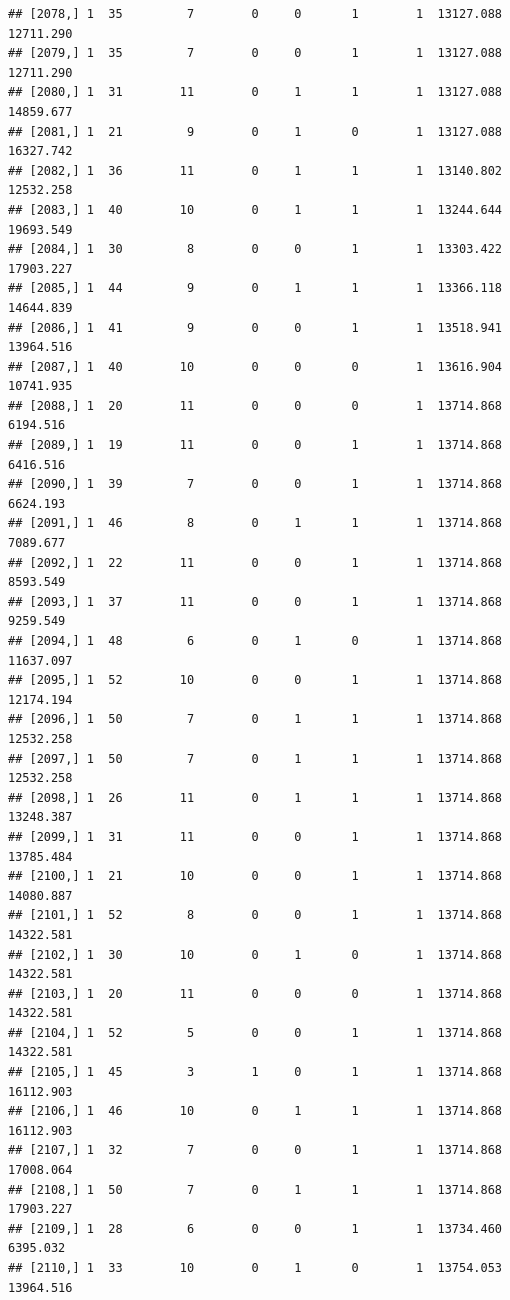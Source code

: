 \documentclass[
]{article}
\begin{document}
\begin{verbatim}
## [2078,] 1  35         7        0     0       1        1  13127.088  12711.290
## [2079,] 1  35         7        0     0       1        1  13127.088  12711.290
## [2080,] 1  31        11        0     1       1        1  13127.088  14859.677
## [2081,] 1  21         9        0     1       0        1  13127.088  16327.742
## [2082,] 1  36        11        0     1       1        1  13140.802  12532.258
## [2083,] 1  40        10        0     1       1        1  13244.644  19693.549
## [2084,] 1  30         8        0     0       1        1  13303.422  17903.227
## [2085,] 1  44         9        0     1       1        1  13366.118  14644.839
## [2086,] 1  41         9        0     0       1        1  13518.941  13964.516
## [2087,] 1  40        10        0     0       0        1  13616.904  10741.935
## [2088,] 1  20        11        0     0       0        1  13714.868   6194.516
## [2089,] 1  19        11        0     0       1        1  13714.868   6416.516
## [2090,] 1  39         7        0     0       1        1  13714.868   6624.193
## [2091,] 1  46         8        0     1       1        1  13714.868   7089.677
## [2092,] 1  22        11        0     0       1        1  13714.868   8593.549
## [2093,] 1  37        11        0     0       1        1  13714.868   9259.549
## [2094,] 1  48         6        0     1       0        1  13714.868  11637.097
## [2095,] 1  52        10        0     0       1        1  13714.868  12174.194
## [2096,] 1  50         7        0     1       1        1  13714.868  12532.258
## [2097,] 1  50         7        0     1       1        1  13714.868  12532.258
## [2098,] 1  26        11        0     1       1        1  13714.868  13248.387
## [2099,] 1  31        11        0     0       1        1  13714.868  13785.484
## [2100,] 1  21        10        0     0       1        1  13714.868  14080.887
## [2101,] 1  52         8        0     0       1        1  13714.868  14322.581
## [2102,] 1  30        10        0     1       0        1  13714.868  14322.581
## [2103,] 1  20        11        0     0       0        1  13714.868  14322.581
## [2104,] 1  52         5        0     0       1        1  13714.868  14322.581
## [2105,] 1  45         3        1     0       1        1  13714.868  16112.903
## [2106,] 1  46        10        0     1       1        1  13714.868  16112.903
## [2107,] 1  32         7        0     0       1        1  13714.868  17008.064
## [2108,] 1  50         7        0     1       1        1  13714.868  17903.227
## [2109,] 1  28         6        0     0       1        1  13734.460   6395.032
## [2110,] 1  33        10        0     1       0        1  13754.053  13964.516

\end{verbatim}
\end{document}
